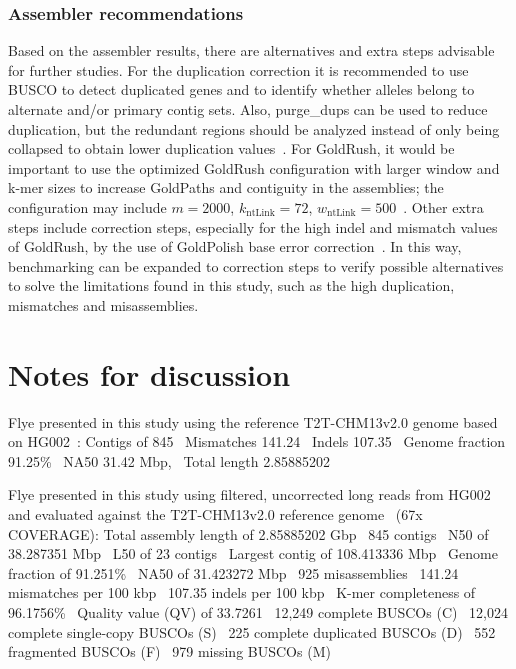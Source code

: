 \documentclass[12pt, letterpaper]{article}
\newif\ifshownotes
\begin{document}
\subsubsection{Assembler recommendations}
\label{sec:assembler_recommendations}
Based on the assembler results, there are alternatives and extra steps advisable for further studies. For the duplication correction it is recommended to use BUSCO to detect duplicated genes and to identify whether alleles belong to alternate and/or primary contig sets. Also, purge\_dups can be used to reduce duplication, but the redundant regions should be analyzed instead of only being collapsed to obtain lower duplication values~\cite{Guan2020,Nurk2020}. For GoldRush, it would be important to use the optimized GoldRush configuration with larger window and k-mer sizes to increase GoldPaths and contiguity in the assemblies; the configuration may include $m=2000$, $k_{\text{ntLink}}=72$, $w_{\text{ntLink}}=500$~\cite{Kazemi2026}. Other extra steps include correction steps, especially for the high indel and mismatch values of GoldRush, by the use of GoldPolish base error correction~\cite{Zhang2025}. In this way, benchmarking can be expanded to correction steps to verify possible alternatives to solve the limitations found in this study, such as the high duplication, mismatches and misassemblies. 


\ifshownotes
\section{Notes for discussion}
Flye presented in this study using the reference T2T-CHM13v2.0 genome based on HG002~\cite{Munoz2025}:
Contigs of 845~\cite{Munoz2025}
Mismatches 141.24~\cite{Munoz2025}
Indels 107.35~\cite{Munoz2025}
Genome fraction 91.25\%~\cite{Munoz2025}
NA50 31.42 Mbp,~\cite{Munoz2025}
Total length 2.85885202~\cite{Munoz2025}

Flye presented in this study using filtered, uncorrected long reads from HG002 and evaluated against the T2T-CHM13v2.0 reference genome~\cite{Munoz2025} (67x COVERAGE):
Total assembly length of 2.85885202 Gbp~\cite{Munoz2025}
845 contigs~\cite{Munoz2025}
N50 of 38.287351 Mbp~\cite{Munoz2025}
L50 of 23 contigs~\cite{Munoz2025}
Largest contig of 108.413336 Mbp~\cite{Munoz2025}
Genome fraction of 91.251\%~\cite{Munoz2025}
NA50 of 31.423272 Mbp~\cite{Munoz2025}
925 misassemblies~\cite{Munoz2025}
141.24 mismatches per 100 kbp~\cite{Munoz2025}
107.35 indels per 100 kbp~\cite{Munoz2025}
K-mer completeness of 96.1756\%~\cite{Munoz2025}
Quality value (QV) of 33.7261~\cite{Munoz2025}
12,249 complete BUSCOs (C)~\cite{Munoz2025}
12,024 complete single-copy BUSCOs (S)~\cite{Munoz2025}
225 complete duplicated BUSCOs (D)~\cite{Munoz2025}
552 fragmented BUSCOs (F)~\cite{Munoz2025}
979 missing BUSCOs (M)~\cite{Munoz2025}
\end{document}
